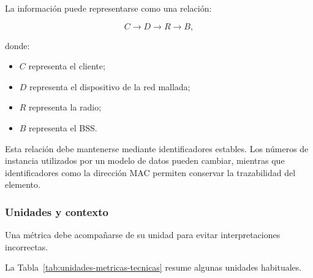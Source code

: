 La información puede representarse como una relación:

\[
    C
    \longrightarrow
    D
    \longrightarrow
    R
    \longrightarrow
    B,
\]

donde:

\begin{itemize}
    \item \(C\) representa el cliente;

    \item \(D\) representa el dispositivo de la red mallada;

    \item \(R\) representa la radio;

    \item \(B\) representa el BSS.
\end{itemize}

Esta relación debe mantenerse mediante identificadores estables. Los
números de instancia utilizados por un modelo de datos pueden cambiar,
mientras que identificadores como la dirección MAC permiten conservar la
trazabilidad del elemento.


\subsubsection*{Unidades y contexto}

Una métrica debe acompañarse de su unidad para evitar interpretaciones
incorrectas.

La Tabla~\ref{tab:unidades-metricas-tecnicas} resume algunas unidades
habituales.

